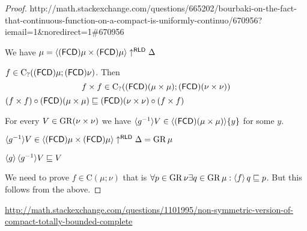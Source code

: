 \begin{proof}

http://math.stackexchange.com/questions/665202/bourbaki-on-the-fact-that-continuous-function-on-a-compact-is-uniformly-continuo/670956?iemail=1\&noredirect=1\#670956

We have $\mu= \langle (\mathsf{FCD}) \mu \times
(\mathsf{FCD}) \mu \rangle \uparrow^{\mathsf{RLD}} \Delta$

$f \in \mathrm{C}_? ((\mathsf{FCD}) \mu; (\mathsf{FCD})
\nu)$. Then
\[ f \times f \in \mathrm{C}_? ((\mathsf{FCD}) (\mu \times
   \mu) ; (\mathsf{FCD}) (\nu \times \nu)) \]
$(f \times f) \circ (\mathsf{FCD}) (\mu \times \mu)
\sqsubseteq (\mathsf{FCD}) (\nu \times \nu) \circ (f \times f)$

For every $V \in \operatorname{GR} (\nu \times \nu)$ we have $\langle g^{- 1} \rangle
V \in \langle (\mathsf{FCD}) (\mu \times \mu) \rangle
\{ y \}$ for some $y$.

$\langle g^{- 1} \rangle V \in \langle (\mathsf{FCD}) \mu \times
(\mathsf{FCD}) \mu \rangle \uparrow^{\mathsf{RLD}} \Delta
= \operatorname{GR} \mu$

$\left\langle g\right\rangle \langle g^{- 1} \rangle V \sqsubseteq V$

We need to prove $f \in \mathrm{C} (\mu; \nu)$ that is $\forall p \in
\operatorname{GR} \nu \exists q \in \operatorname{GR} \mu: \left\langle f\right\rangle q
\sqsubseteq p$. But this follows from the above.
\end{proof}


\url{http://math.stackexchange.com/questions/1101995/non-symmetric-version-of-compact-totally-bounded-complete}